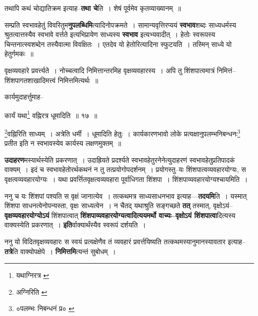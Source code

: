 \documentclass[article,12pt,a4paper]{memoir}
\begin{document}
	  \pstart तथापि कथं चोद्यातिक्रम इत्याह--\textbf{तथा चे}ति । शेषं पूर्वमेव कृतव्याख्यानम् ॥
	\pend
      

	  \pstart सम्प्रति स्वभावहेतुं विवरितुम\textbf{नुपलब्धिमि}त्यादिनोपक्रमते । सामान्यवृत्तिरप्ययं \textbf{स्वभाव}शब्दः साध्यधर्मस्य श्रुतत्वात्तस्यैव स्वभावे वर्त्तते इत्यभिप्रायेण साध्यस्य \textbf{स्वभाव} इत्यभ्यवादीत् । हेतोः स्वरूपस्य चिन्तनात्स्वशब्देन तस्यैवात्मा विवक्षितः । एतदेव यो हेतोरित्यादिना स्फुटयति । तस्मिन् साध्ये यो हेतुर्गमकः ॥
	\pend
	  \bigskip
	  \begingroup
	

	  \pstart वृक्षव्यवहारे प्रवर्त्त्यते । नोच्चत्वादि निमित्तान्तरमिह वृक्षव्यवहारस्य । अपि तु शिंशपात्वमात्रं निमित्तं--शिंशपागतशाखादिमत्त्वं निमित्तमित्यर्थः ॥
	\pend
       

	  \pstart कार्यमुदाहर्त्तुमाह--
	\pend
       
	  \bigskip
	  \begingroup
	

	  \pstart कार्यं यथा\footnote{यथाग्निरत्र \cite{dp-msB} \cite{dp-msD} \cite{dp-edP} \cite{dp-edH} \cite{dp-edE} \cite{dp-edN}} वह्निरत्र धूमादिति ॥ १७ ॥
	\pend
      
	  \endgroup
	 

	  \pstart \footnote{अग्निरिति \cite{dp-msB} \cite{dp-msD} \cite{dp-edP} \cite{dp-edH} \cite{dp-edE} \cite{dp-edN}}\-वह्निरिति साध्यम् । अत्रेति धर्मी । धूमादिति हेतुः । कार्यकारणभावो लोके प्रत्यक्षानुपलम्भनिबन्धनः\footnote{०पलम्भः निबन्धनं प्र० \cite{dp-msB}} प्रतीत इति न स्वभावस्येव कार्यस्य लक्षणमुक्तम् ॥
	\pend
      
	  \endgroup
	

	  \pstart \textbf{उदाहरण}मस्यार्थस्येति प्रकरणात् । उदाह्रियते प्रदर्श्यते स्वभावहेतुरनेनेत्युदाहरणं स्वभावहेतुप्रतिपादकं वाक्यम् । इदं च स्वभावहेतोरर्थकथनं न तु तत्प्रयोगोपदर्शनम् । प्रयोगस्तु--यः शिंशपात्वव्यवहारयोग्यः, स वृक्षत्वव्यवहारयोग्यः । यथा प्रवर्त्तितवृक्षत्वव्यवहारा पूर्वाधिगता शिंशपा । शिंशपाव्यवहारयोग्यश्चायमिति ।
	\pend
      

	  \pstart ननु च यः शिंशपां पश्यति स वृक्षं जानात्येव । तत्कथमत्र साध्यसाधनभाव इत्याह—\textbf{तदयमि}ति । यस्मात् शिंशपा साधनत्वेनोपन्यस्ता, वृक्षः साध्यत्वेन । न चैतद् यथाश्रुति सङ्गच्छते \textbf{तत्} तस्मात्, वृक्षोऽयं--\textbf{वृक्षव्यवहारयो}\leavevmode{}\textbf{ग्योऽयं} शिंशपात्वात् \textbf{शिंशपाव्यवहारयोग्यत्वादित्ययमर्थो वाच्यः--वृक्षोऽयं शिंशपात्वा}दित्यस्य वाक्यस्येति प्रकरणात् । \textbf{इति}र्वाक्यार्थंस्यैव स्वरूपं दर्शयति ।
	\pend
      

	  \pstart ननु यो विदितवृक्षव्यवहारः स स्वयं प्रत्यक्षेणैव तं व्यवहारं प्रवर्त्तयिष्यति तत्कथमस्यानुमानस्यावतार इत्याह--\textbf{तत्रे}ति वाक्योपक्षेपे । \textbf{निमित्तमि}त्यन्तं सुबोधम् ।
	\pend
      
\end{document}
